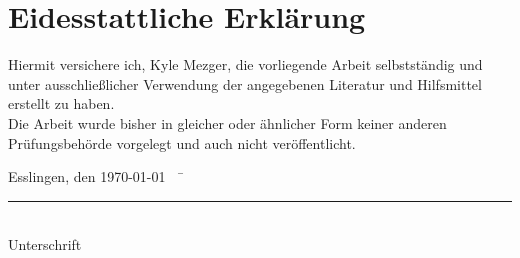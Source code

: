 \chapter*{Eidesstattliche Erklärung}

Hiermit versichere ich, Kyle Mezger, die vorliegende Arbeit selbstständig und unter ausschließlicher Verwendung der angegebenen Literatur und Hilfsmittel erstellt zu haben.\\
Die Arbeit wurde bisher in gleicher oder ähnlicher Form keiner anderen Prüfungsbehörde vorgelegt und auch nicht veröffentlicht.\\
\begin{tabbing}
          Esslingen, den \today ~~	\= \rule{5cm}{0.3mm}\\
                                                                                                    \> Unterschrift
\end{tabbing}